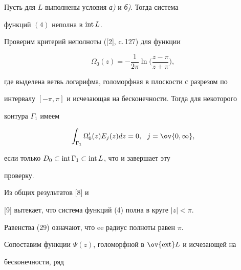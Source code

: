\begin{lem} 


Пусть для $L$ выполнены условия {\em а)} и {\em б)}. Тогда система 


функций $(4)$ неполна в $\operatorname{int} L$.  


\end{lem} 


 


\begin{pf} 


Проверим критерий неполноты ([2], c.\,127) для функции 


\begin{equation} 


\Omega_0(z)=-\frac{1}{2\pi}\ln\bigg(\frac{z-\pi}{z+\pi} \bigg), 


\end{equation} 


где выделена ветвь логарифма, голоморфная в плоскости с разрезом по  


интервалу $[-\pi,\pi]$ и исчезающая на бесконечности. Тогда для некоторого  


контура $\Gamma_1$ имеем 


\begin{equation} 


\int_{\Gamma_1} \Omega'_0(z)E_j(z)d z=0,\ \ j=\ov{0,\infty}, 


\end{equation} 


если только $D_0\subset\operatorname{int}\Gamma_1\subset\operatorname{int} L$, что и завершает эту 


проверку. 


\end{pf} 


 


\begin{note} 


Из общих результатов [8] и  


[9] вытекает, что система функций (4) полна в круге $|z|<\pi$. 


Равенства (29) означают, что ee радиус полноты равен $\pi$. 


\end{note} 


 


Сопоставим функции $\Psi(z)$, голоморфной в $\ov{\ext}L$ и исчезающей на  


бесконечности, ряд 


